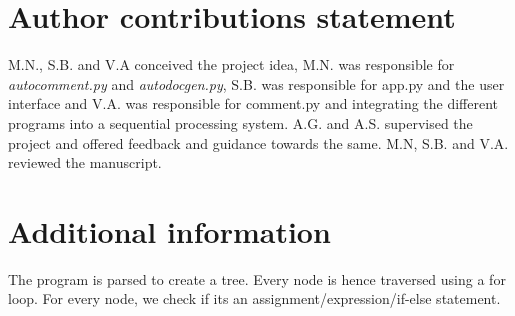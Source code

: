 \documentclass[fleqn,10pt]{wlscirep}
\begin{document}


\section*{Author contributions statement}

M.N., S.B. and V.A conceived the project idea,  M.N. was responsible for \textit{autocomment.py} and \textit{autodocgen.py}, S.B. was responsible for app.py and the user interface and V.A. was responsible for comment.py and integrating the different programs into a sequential processing system. A.G. and A.S. supervised the project and offered feedback and guidance towards the same. M.N, S.B. and V.A. reviewed the manuscript.

\section*{Additional information}

The program is parsed to create a tree. Every node is hence traversed using a for loop. For every node, we check if its an assignment/expression/if-else statement.
\end{document}
